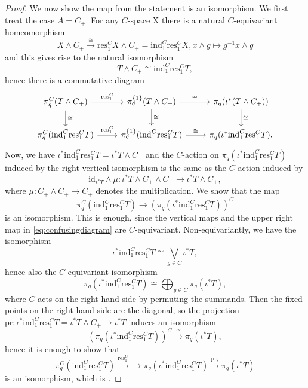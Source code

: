 \begin{proof}
We now show the map from the statement is an isomorphism.
We first treat the case $A = C_+$. For any $C$-space X
there is a natural $C$-equivariant homeomorphism
\begin{equation}\label{eq:untwist}
X\wedge C_+\xrightarrow{\cong} \mathrm{res}^C_1 X \wedge C_+ = 
\mathrm{ind}^C_1 \mathrm{res}^C_1 X, x\wedge g\mapsto g^{-1}x\wedge g
\end{equation}
and this gives rise to the natural isomorphism
\[T\wedge C_+\cong \mathrm{ind}^C_1 \mathrm{res}^C_1 T,\]
hence there is a commutative diagram
\begin{equation}\label{eq:confusingdiagram}
\begin{tikzcd}
\pi_q^C(T\wedge C_+)\arrow{d}{\cong}\arrow{r}{\mathrm{res}^C_1}
&\pi_q^{\{1\}}(T\wedge C_+)\arrow{d}{\cong}\arrow{r}{\cong}
&\pi_q(\iota^\ast (T\wedge C_+))\arrow{d}{\cong}
\\
\pi_q^C(\mathrm{ind}^C_1 \mathrm{res}^C_1 T)\arrow{r}{\mathrm{res}^C_1}
&\pi_q^{\{1\}}(\mathrm{ind}^C_1 \mathrm{res}^C_1 T)\arrow{r}{\cong}
&\pi_q(\iota^\ast \mathrm{ind}^C_1 \mathrm{res}^C_1 T).
\end{tikzcd}
\end{equation}
Now, we have $\iota^\ast \mathrm{ind}^C_1 \mathrm{res}^C_1 T = \iota^\ast T\wedge C_+$
and the $C$-action on $\pi_q(\iota^\ast \mathrm{ind}^C_1 \mathrm{res}^C_1 T)$
induced by the right vertical isomorphism is the same as the $C$-action
induced by
\[\mathrm{id}_{\iota^\ast T}\wedge \mu:\iota^\ast T\wedge C_+\wedge C_+\to \iota^\ast T\wedge C_+,\]
where $\mu:C_+\wedge C_+\to C_+$ denotes the multiplication. We show that 
the map 
\begin{equation}\label{eq:restriction}
\pi_q^C(\mathrm{ind}^C_1 \mathrm{res}^C_1 T)
\to \left(\pi_q(\iota^\ast \mathrm{ind}^C_1 \mathrm{res}^C_1 T)\right)^C
\end{equation}
is an isomorphism. This is enough, since the vertical maps and the upper right map in \eqref{eq:confusingdiagram}
are $C$-equivariant. Non-equivariantly, we have the isomorphism 
\[
\iota^\ast \mathrm{ind}^C_1 \mathrm{res}^C_1 T\cong \bigvee_{g\in C} \iota^\ast T,\]
hence also the $C$-equivariant isomorphism
\[
\pi_q(\iota^\ast \mathrm{ind}^C_1 \mathrm{res}^C_1 T)\cong \bigoplus_{g\in C} \pi_q(\iota^\ast T),
\]
where $C$ acts on the right hand side by permuting the summands.
Then the fixed points on the right hand side are the diagonal, so the projection
$\mathrm{pr}:\iota^\ast \mathrm{ind}^C_1 \mathrm{res}^C_1 T = \iota^\ast T\wedge C_+\to 
\iota^\ast T$ induces an isomorphism
\[
\left(\pi_q(\iota^\ast \mathrm{ind}^C_1 \mathrm{res}^C_1 T)\right)^C\xrightarrow{\cong}
\pi_q(\iota^\ast T),
\]
hence it is enough to show that 
\[
\pi_q^C(\mathrm{ind}^C_1 \mathrm{res}^C_1 T)\xrightarrow{\mathrm{res}^C_1}
\to \pi_q(\iota^\ast \mathrm{ind}^C_1 \mathrm{res}^C_1 T)
\xrightarrow{\mathrm{pr}_\ast} \pi_q(\iota^\ast T)
\]
is an isomorphism, which is \cite[Proposition 4.11, \pno~30]{schwedeequivariant}.


\end{proof}
